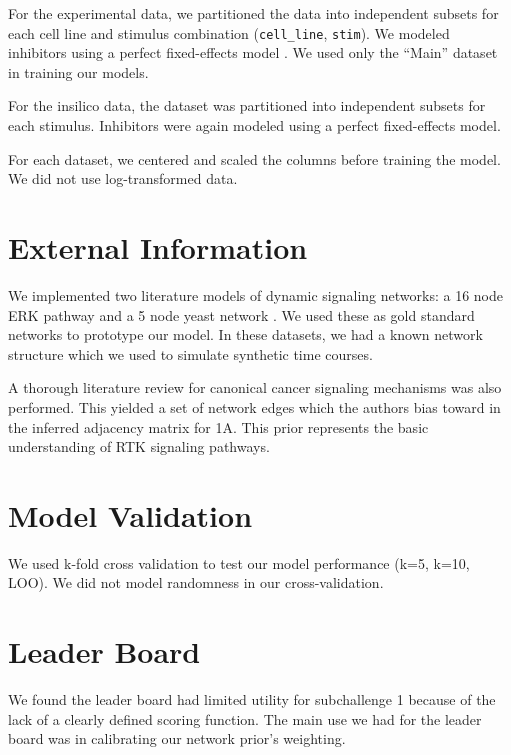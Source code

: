 \documentclass[letterpaper, 11pt]{article}
\begin{document}
For the experimental data, we partitioned the data into independent subsets for each cell line and stimulus combination (\texttt{cell\_line}, \texttt{stim}). We modeled inhibitors using a perfect fixed-effects model \citep{Spencer2012}. We used only the ``Main'' dataset in training our models.

For the insilico data, the dataset was partitioned into independent subsets for each stimulus. Inhibitors were again modeled using a perfect fixed-effects model.

For each dataset, we centered and scaled the columns before training the model. We did not use log-transformed data.

\section{External Information}

We implemented two literature models of dynamic signaling networks: a 16 node ERK pathway \citep{Xu2010} and a 5 node yeast network \citep{Cantone2009}. We used these as gold standard networks to prototype our model. In these datasets, we had a known network structure which  we used to simulate synthetic time courses.

A thorough literature review for canonical cancer signaling mechanisms was also performed.  This yielded a set of network edges which the authors bias toward in the inferred adjacency matrix for 1A.  This prior represents the basic understanding of RTK signaling pathways.

\section{Model Validation}

We used k-fold cross validation to test our model performance (k=5, k=10, LOO). We did not model randomness in our cross-validation.

\section{Leader Board}

We found the leader board had limited utility for subchallenge 1 because of the lack of a clearly defined scoring function. The main use we had for the leader board was in calibrating our network prior's weighting.
\end{document}
